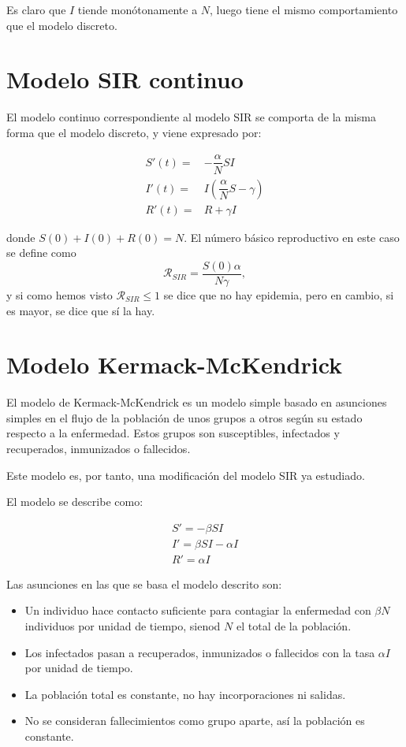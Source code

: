 Es claro que $I$ tiende monótonamente a $N$, luego tiene el mismo comportamiento que el modelo discreto.


\section{Modelo SIR continuo}


El modelo continuo correspondiente al modelo SIR se comporta de la misma forma que el modelo discreto, y viene expresado por:

\begin{equation}
\label{eqn: modelo_SIR_continuo}
\begin{aligned}
S'(t) = & -\dfrac{\alpha}{N}SI \\
I'(t) = & I\left(\dfrac{\alpha}{N}S-\gamma \right) \\
R'(t) = & R+\gamma I
\end{aligned}
\end{equation}

donde $S(0)+I(0)+R(0)=N$. El número básico reproductivo en este caso se define como
$$\mathcal{R}_{SIR}=\frac{S(0)\alpha }{N\gamma },$$
y si como hemos visto $\mathcal{R}_{SIR}\leq 1$  se dice que no hay epidemia, pero en cambio, si es mayor, se dice que sí la hay.

\section{Modelo Kermack-McKendrick}

El modelo de Kermack-McKendrick es un modelo simple basado en asunciones simples en el flujo de la población de unos grupos a otros según su estado respecto a la enfermedad. Estos grupos son susceptibles, infectados y recuperados, inmunizados o fallecidos.

Este modelo es, por tanto, una modificación del modelo SIR ya estudiado.

El modelo se describe como:

\begin{equation}
\label{eqn: KMK}
\begin{aligned}
S' = -\beta SI \\
I' = \beta SI - \alpha I \\
R' = \alpha I
\end{aligned}
\end{equation}

Las asunciones en las que se basa el modelo descrito son:

\begin{itemize}
\item Un individuo hace contacto suficiente para contagiar la enfermedad con $\beta N$ individuos por unidad de tiempo, sienod $N$ el total de la población.
\item Los infectados pasan a recuperados, inmunizados o fallecidos con la tasa $\alpha I$ por unidad de tiempo.
\item La población total es constante, no hay incorporaciones ni salidas.
\item No se consideran fallecimientos como grupo aparte, así la población es constante.
\end{itemize}

